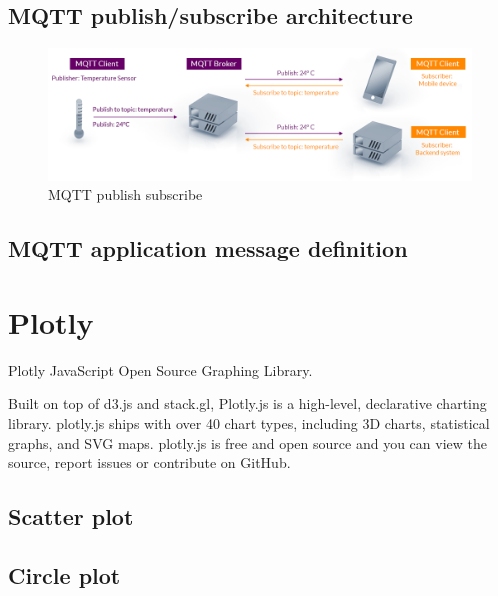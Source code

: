\documentclass[\main/main.tex]{subfiles}
\begin{document}
\subsection*{MQTT publish/subscribe architecture}
\begin{figure}[H]
    \begin{center}
        \includegraphics[scale=0.4]{mqtt-publish-subscribe.png}
    \end{center}
    \caption{MQTT publish subscribe}
    \label{fig:mqtt_publish_subscribe.}
\end{figure}

\subsection*{MQTT application message definition}

\section{Plotly}
Plotly JavaScript Open Source Graphing Library.

Built on top of d3.js and stack.gl, Plotly.js is a high-level, declarative charting library. plotly.js ships with over 40 chart types, including 3D charts, statistical graphs, and SVG maps.
plotly.js is free and open source and you can view the source, report issues or contribute on GitHub. \cite{web_plotly}

\subsection{Scatter plot}

\subsection{Circle plot}
\bib
\end{document}
